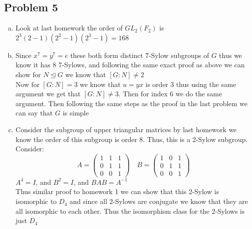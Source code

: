 \documentclass[12pt, letterpaper]{article}
\theoremstyle{definition}
\begin{document}
\subsection*{Problem 5}
\begin{enumerate}[(a)]
  \item Look at last homework the order of $GL_2(F_2)$ is $2^{3}(2-1)(2^2-1)(2^3-1)=168$
  \item Since $x^7=y^7=e$ these both form distinct 7-Sylow subgroups of $G$ thus we know it has 8 7-Sylows, and following the same exact proof as above we can show for $N \unlhd G$ we know that $[G : N] \neq 2$\\
  Now for $[G : N]=3$ we know that $u=yx$ is order 3 thus using the same argument we get that $[G : N] \neq 3$. Then for index 6 we do the same argument. Then following the same steps as the proof in the last problem we can say that $G$ is simple
  \item Consider the subgroup of upper triangular matrices by last homework we know the order of this subgroup is order 8. Thus, this is a 2-Sylow subgroup.\\
  Consider: \[
  A=\begin{pmatrix}
    1 & 1 & 1\\
    0 & 1 & 1\\
    0 & 0 & 1
  \end{pmatrix} \quad
  B=\begin{pmatrix}
    1 & 0 & 1\\
    0 & 1 & 1\\
    0 & 0 & 1
  \end{pmatrix}
  \]
  $A^4=I$, and $B^2=I$, and $BAB=A^{-1}$\\
  Thus similar proof to homework 1 we can show that this 2-Sylow is isomorphic to $D_4$ and since all 2-Sylows are conjugate we know that
  they are all isomorphic to each other. Thus the isomorphism class for the 2-Sylows is just $D_4$
\end{enumerate}

\newpage
\end{document}
